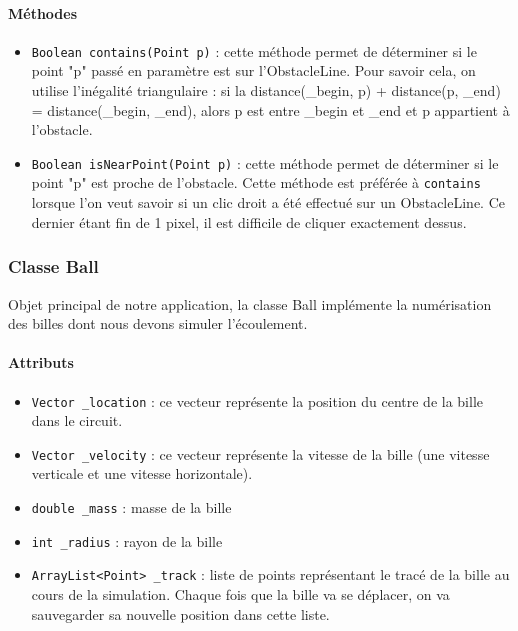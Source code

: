 \documentclass{report}
\begin{document}
\paragraph*{Méthodes}
\begin{itemize}
\item \texttt{Boolean contains(Point p)} : cette méthode permet de déterminer si le point "p" passé en paramètre est sur l'ObstacleLine. Pour savoir cela, on utilise l'inégalité triangulaire : si la distance(\_begin, p)  + distance(p, \_end) = distance(\_begin, \_end), alors p est entre \_begin et \_end et p appartient à l'obstacle.
\item \texttt{Boolean isNearPoint(Point p)} : cette méthode permet de déterminer si le point "p" est proche de l'obstacle. Cette méthode est préférée à \texttt{contains} lorsque l'on veut savoir si un clic droit a été effectué sur un ObstacleLine. Ce dernier étant fin de 1 pixel, il est difficile de cliquer exactement dessus.
\end{itemize}

\subsubsection{Classe Ball}

Objet principal de notre application, la classe Ball implémente la numérisation des billes dont nous devons simuler l'écoulement.

\paragraph*{Attributs}
\begin{itemize}
\item \texttt{Vector \_location} : ce vecteur représente la position du centre de la bille dans le circuit. 
\item \texttt{Vector \_velocity} : ce vecteur représente la vitesse de la bille (une vitesse verticale et une vitesse horizontale).
\item \texttt{double \_mass} : masse de la bille
\item \texttt{int \_radius} : rayon de la bille
\item \texttt{ArrayList<Point> \_track} : liste de points représentant le tracé de la bille au cours de la simulation. Chaque fois que la bille va se déplacer, on va sauvegarder sa nouvelle position dans cette liste.
\end{itemize}
\end{document}
